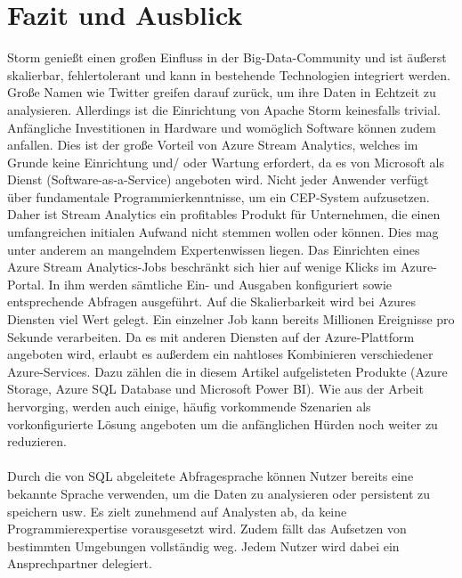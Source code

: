 \section{Fazit und Ausblick}
Storm genießt einen großen Einfluss in der Big-Data-Community und ist äußerst skalierbar, fehlertolerant und kann in bestehende Technologien integriert werden. Große Namen wie Twitter greifen darauf zurück, um ihre Daten in Echtzeit zu analysieren. Allerdings ist die Einrichtung von Apache Storm keinesfalls trivial. Anfängliche Investitionen in Hardware und womöglich Software können zudem anfallen. Dies ist der große Vorteil von Azure Stream Analytics, welches im Grunde keine Einrichtung und/ oder Wartung erfordert, da es von Microsoft als Dienst (Software-as-a-Service) angeboten wird. Nicht jeder Anwender verfügt über fundamentale Programmierkenntnisse, um ein CEP-System aufzusetzen. Daher ist Stream Analytics ein profitables Produkt für Unternehmen, die einen umfangreichen initialen Aufwand nicht stemmen wollen oder können. Dies mag unter anderem an mangelndem Expertenwissen liegen. Das Einrichten eines Azure Stream Analytics-Jobs beschränkt sich hier auf wenige Klicks im Azure-Portal. In ihm werden sämtliche Ein- und Ausgaben konfiguriert sowie entsprechende Abfragen ausgeführt. Auf die Skalierbarkeit wird bei Azures Diensten viel Wert gelegt. Ein einzelner Job kann bereits Millionen Ereignisse pro Sekunde verarbeiten. Da es mit anderen Diensten auf der Azure-Plattform angeboten wird, erlaubt es außerdem ein nahtloses Kombinieren verschiedener Azure-Services. Dazu zählen die in diesem Artikel aufgelisteten Produkte (Azure Storage, Azure SQL Database und Microsoft Power BI). Wie aus der Arbeit hervorging, werden auch einige, häufig vorkommende Szenarien als vorkonfigurierte Lösung angeboten um die anfänglichen Hürden noch weiter zu reduzieren.\\ \\
Durch die von SQL abgeleitete Abfragesprache können Nutzer bereits eine bekannte Sprache verwenden, um die Daten zu analysieren oder persistent zu speichern usw. Es zielt zunehmend auf Analysten ab, da keine Programmierexpertise vorausgesetzt wird. Zudem fällt das Aufsetzen von bestimmten Umgebungen vollständig weg. Jedem Nutzer wird dabei ein Ansprechpartner delegiert.\\ \\
